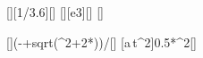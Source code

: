 [\kmph][1/3.6][\mps]
[\km][e3][\m]
[\mpss]

[]{(-\vMoX+sqrt(\vMoX^2+2*\aFaX*\dMoX))/\aFaX}[\s]
[a\,t^2]{0.5*\aFaX*\tMoX^2}[\m]
